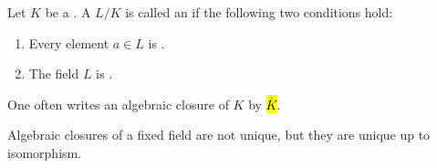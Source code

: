 \begin{definition} \label{definition:algebraic_closure_of_a_field}
Let $K$ be a . A  $L / K$ is called an  if the following two conditions hold:
\begin{enumerate}
    \item Every element $a \in L$ is .
    \item The field $L$ is .
\end{enumerate}
One often writes an algebraic closure of $K$ by \hl{$\overline{K}$}.

Algebraic closures of a fixed field are not unique, but they are unique up to isomorphism. 
\end{definition}